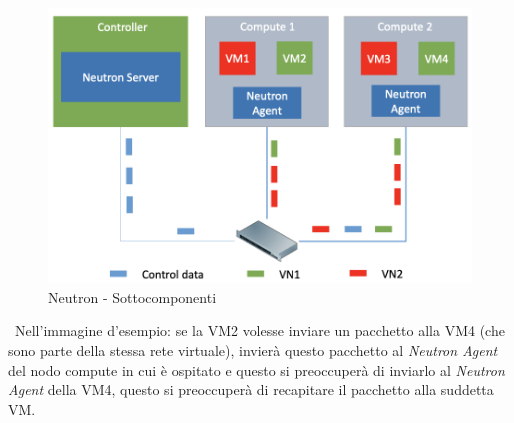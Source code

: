 \documentclass{article}
\begin{document}
\begin{figure}[H]
    \centering
    \includegraphics[scale=0.5]{img/neutron subcomponents.png}
    \caption{Neutron - Sottocomponenti}
\end{figure}\
Nell'immagine d'esempio: se la VM2 volesse inviare un pacchetto alla VM4 (che sono parte della stessa rete virtuale), invierà questo pacchetto al \textit{Neutron Agent} del nodo compute in cui è ospitato e questo si preoccuperà di inviarlo al \textit{Neutron Agent} della VM4, questo si preoccuperà di recapitare il pacchetto alla suddetta VM.
\end{document}
